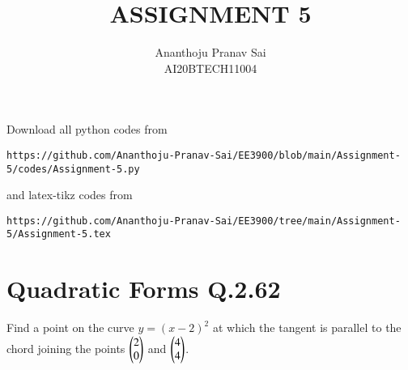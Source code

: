 \documentclass[journal,12pt,twocolumn]{IEEEtran}
\begin{document}
     \def\centbox#1{\makebox[0in]{#1}}
     \def\topbox#1{\raisebox{-\baselineskip}[0in][0in]{#1}}
     \def\midbox#1{\raisebox{-0.5\baselineskip}[0in][0in]{#1}}
\vspace{3cm}
\title{ASSIGNMENT 5}
\author{Ananthoju Pranav Sai \\ AI20BTECH11004}
\maketitle
\newpage
\bigskip
\renewcommand{\thefigure}{\theenumi}
\renewcommand{\thetable}{\theenumi}
Download all python codes from 
\begin{lstlisting}
https://github.com/Ananthoju-Pranav-Sai/EE3900/blob/main/Assignment-5/codes/Assignment-5.py
\end{lstlisting}
%
and latex-tikz codes from 
%
\begin{lstlisting}
https://github.com/Ananthoju-Pranav-Sai/EE3900/tree/main/Assignment-5/Assignment-5.tex
\end{lstlisting}
%
\section{Quadratic Forms Q.2.62}
Find a point on the curve $y=(x-2)^2$ at which the tangent is parallel to the chord joining the points $\begin{pmatrix}2\\0\end{pmatrix}$ and $\begin{pmatrix}4\\4\end{pmatrix}$.
\end{document}
